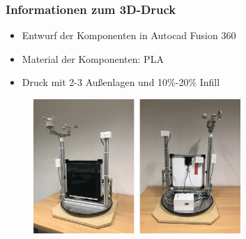 \documentclass{beamer}
\begin{document}
\begin{frame}
  \frametitle{Informationen zum 3D-Druck}
  \begin{itemize}
  \item Entwurf der Komponenten in Autocad Fusion 360
  \item Material der Komponenten: PLA
  \item Druck mit 2-3 Außenlagen und 10\%-20\% Infill
  \end{itemize}
\begin{figure}[H]
  \centering
  \includegraphics[width=0.7\textwidth]{./img/Wetterstaion_fertig1.jpg}
\end{figure}
  
\end{frame}

\end{document}
